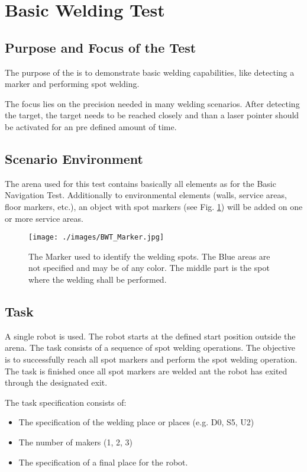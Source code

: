 \newpage
\section{Basic Welding Test}

\subsection{Purpose and Focus of the Test}
The purpose of the  is to demonstrate basic welding capabilities, like detecting a marker and performing spot welding. 
\par
The focus lies on the precision needed in many welding scenarios. After detecting the target, the target needs to be reached closely and than a laser pointer should be activated for an pre defined amount of time.

\subsection{Scenario Environment}
The arena used for this test contains basically all elements as for the Basic Navigation Test. Additionally to environmental elements (walls, service areas, floor markers, etc.), an object with spot markers (see Fig. \ref{BWT_Label}) will be added on one or more service areas. 

\begin{figure} [h!]
\begin{center}
\texttt{[image: ./images/BWT\_Marker.jpg]} 
\caption{The Marker used to identify the welding spots. The Blue areas are not specified and may be of any color. The middle part is the spot where the welding shall be performed.}
\label{BWT_Label}
\end{center}
\end{figure}


\subsection{Task}
A single robot is used. The robot starts at the defined start position outside the arena. The task consists of a sequence of spot welding operations. The objective is to successfully reach all spot markers and perform the spot welding operation. The task is finished once all spot markers are welded ant the robot has exited through the designated exit.
\par
The task specification consists of: 
\begin{itemize}
	\item The specification of the welding place or places (e.g. D0, S5, U2)
	\item The number of makers (1, 2, 3)
	\item The specification of a final place for the robot.
\end{itemize}

